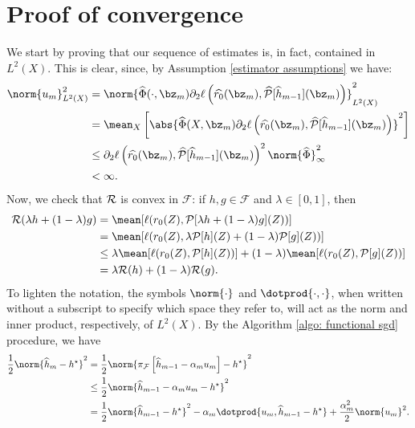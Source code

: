 \section{Proof of convergence}

We start by proving that our sequence of estimates is, in fact, contained in $ L^{ 2 } ( X ) $.
This is clear, since, by Assumption \ref{estimator assumptions} we have:
\begin{align}
    \norm{ u_{ m } }_{ L^{ 2 } ( X ) }^2
    &= \norm{
        \hat{ \Phi } ( \cdot, \bz_{ m } ) \partial_{ 2 } \ell \left(
            \hat{ r_{ 0 } } ( \bz_{ m } ), \hat{ \meanop } [ \hat{ h }_{ m-1 } ] ( \bz_{ m } )
        \right)
    }_{ L^{ 2 } ( X ) }^2 \nonumber \\
    &= \mean_{ X } \left[
        \abs{ 
            \hat{ \Phi } ( X, \bz_{ m } ) \partial_{ 2 } \ell \left(
                \hat{ r_{ 0 } } ( \bz_{ m } ),
                \hat{ \meanop } [ \hat{ h }_{ m-1 } ] ( \bz_{ m } )
            \right)
        }^2
    \right] \nonumber \\
    &\leq \partial_{ 2 } \ell \left(
                \hat{ r_{ 0 } } ( \bz_{ m } ),
                \hat{ \meanop } [ \hat{ h }_{ m-1 } ] ( \bz_{ m } )
    \right)^2
    \norm{ \hat{ \Phi } }_{ \infty }^2 \label{ali: u_m bound} \\
    &< \infty \nonumber
.\end{align}
Now, we check that $ \mathcal{R} $ is convex in $ \mathcal{F} $:
if $ h, g \in \mathcal{F} $ and $ \lambda \in [ 0, 1 ] $, then
\begin{align*}
    \risk ( \lambda h + ( 1 - \lambda ) g )
    &= \mean [ \loss ( r_{ 0 } ( Z ), \meanop [ \lambda h + ( 1 - \lambda ) g ] ( Z ) ) ] \\
    &= \mean [ \loss ( r_{ 0 } ( Z ), \lambda \meanop [ h ] ( Z ) + ( 1 - \lambda ) \meanop [ g ] ( Z ) ) ] \\
    &\leq \lambda \mean [ \loss ( r_{ 0 } ( Z ), \meanop [ h ] ( Z ) ) ] + ( 1 - \lambda ) \mean [ \loss ( r_{ 0 } ( Z ), \meanop [ g ] ( Z ) ) ] \\
    &= \lambda \risk ( h ) + ( 1 - \lambda ) \risk ( g )
.\end{align*}
To lighten the notation, the symbols $ \norm{ \cdot } $ and $ \dotprod{ \cdot, \cdot } $, when written without a subscript to specify which space they refer to, will act as the norm and inner product, respectively, of $ L^2 ( X ) $.
By the Algorithm \ref{algo: functional sgd} procedure, we have
\begin{align*}
    \frac{ 1 }{ 2 } \norm{ \hat{ h }_{ m } - \hstar }^2
    &= \frac{ 1 }{ 2 } \norm{ \pi_{ \mathcal{F} } \left[ \hat{ h }_{ m-1 } - \alpha_{ m } u_{ m } \right] - \hstar }^2 \\
    &\leq \frac{ 1 }{ 2 } \norm{ \hat{ h }_{ m-1 } - \alpha_{ m } u_{ m } - \hstar }^2 \\
    &= \frac{ 1 }{ 2 } \norm{ \hat{ h }_{ m-1 } - \hstar }^2
    - \alpha_{ m } \dotprod{ u_{ m }, \hat{ h }_{ m-1 } - \hstar }
    + \frac{ \alpha_{ m }^2 }{ 2 } \norm{ u_{ m } }^2
.\end{align*}
